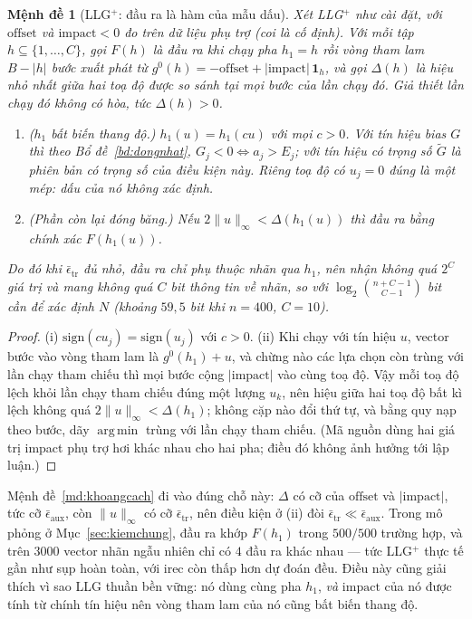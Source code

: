 \documentclass[11pt]{article}
\newtheorem{menhde}[dinhly]{Mệnh đề}
\theoremstyle{remark}
\newcommand{\one}{\mathbf{1}}
\DeclareMathOperator*{\argminop}{arg\,min}
\begin{document}
\begin{menhde}[LLG$^+$: đầu ra là hàm của mẫu dấu]
\label{md:llgp}
Xét LLG$^+$ như cài đặt, với $\mathrm{offset}$ và $\mathrm{impact}<0$ đo trên
dữ liệu phụ trợ (coi là cố định). Với mỗi tập $h \subseteq \{1,\dots,C\}$, gọi
$F(h)$ là đầu ra khi chạy pha $h_1 = h$ rồi vòng tham lam $B-|h|$ bước xuất
phát từ $g^0(h) = -\mathrm{offset} + |\mathrm{impact}|\,\one_h$, và gọi
$\Delta(h)$ là hiệu nhỏ nhất giữa hai toạ độ được so sánh tại mọi bước của
lần chạy đó. Giả thiết lần chạy đó \emph{không có hòa}, tức $\Delta(h)>0$.
\begin{enumerate}
\item[(i)] \textup{($h_1$ bất biến thang độ.)} $h_1(u) = h_1(cu)$ với mọi
 $c>0$. Với tín hiệu bias $G$ thì theo Bổ đề~\ref{bd:dongnhat},
 $G_j<0 \iff a_j > E_j$; với tín hiệu có trọng số $\tilde G$ là phiên bản có
 trọng số của điều kiện này. Riêng toạ độ có $u_j = 0$ đúng là một mép: dấu
 của nó không xác định.
\item[(ii)] \textup{(Phần còn lại đóng băng.)} Nếu
 $2\|u\|_\infty < \Delta(h_1(u))$ thì đầu ra \emph{bằng chính xác}
 $F(h_1(u))$.
\end{enumerate}
Do đó khi $\bar\epsilon_{\mathrm{tr}}$ đủ nhỏ, đầu ra chỉ phụ thuộc nhãn qua
$h_1$, nên nhận không quá $2^C$ giá trị và mang không quá $C$ bit thông tin
về nhãn, so với $\log_2\binom{n+C-1}{C-1}$ bit cần để xác định $N$ (khoảng
$59{,}5$ bit khi $n=400$, $C=10$).
\end{menhde}

\begin{proof}
(i) $\mathrm{sign}(cu_j) = \mathrm{sign}(u_j)$ với $c>0$. (ii) Khi chạy với
tín hiệu $u$, vector bước vào vòng tham lam là $g^0(h_1) + u$, và chừng nào các
lựa chọn còn trùng với lần chạy tham chiếu thì mọi bước cộng
$|\mathrm{impact}|$ vào cùng toạ độ. Vậy mỗi toạ độ lệch khỏi lần chạy tham
chiếu đúng một lượng $u_k$, nên hiệu giữa hai toạ độ bất kì lệch không quá
$2\|u\|_\infty < \Delta(h_1)$; không cặp nào đổi thứ tự, và bằng quy nạp theo
bước, dãy $\argminop$ trùng với lần chạy tham chiếu. (Mã nguồn dùng hai giá
trị impact phụ trợ hơi khác nhau cho hai pha; điều đó không ảnh hưởng tới lập
luận.)
\end{proof}

Mệnh đề~\ref{md:khoangcach} đi vào đúng chỗ này: $\Delta$ có cỡ của
$\mathrm{offset}$ và $|\mathrm{impact}|$, tức cỡ $\bar\epsilon_{\mathrm{aux}}$,
còn $\|u\|_\infty$ có cỡ $\bar\epsilon_{\mathrm{tr}}$, nên điều kiện ở (ii)
đòi $\bar\epsilon_{\mathrm{tr}} \ll \bar\epsilon_{\mathrm{aux}}$. Trong mô
phỏng ở Mục~\ref{sec:kiemchung}, đầu ra khớp $F(h_1)$ trong $500/500$ trường
hợp, và trên $3000$ vector nhãn ngẫu nhiên chỉ có $4$ đầu ra khác nhau ---
tức LLG$^+$ thực tế gần như sụp hoàn toàn, với irec còn thấp hơn dự đoán đều.
Điều này cũng giải thích vì sao LLG thuần bền vững: nó dùng cùng pha $h_1$,
\emph{và} $\mathrm{impact}$ của nó được tính từ chính tín hiệu nên vòng tham
lam của nó cũng bất biến thang độ.
\end{document}
